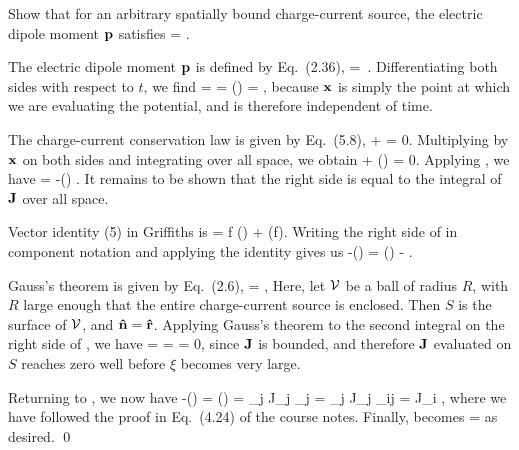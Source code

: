 \begin{statement}{}
	Show that for an arbitrary spatially bound charge-current source, the electric dipole moment $\vb{p}$ satisfies
	\beq
		 = \int \vJ \dcx.
	\eeq
\end{statement}

\begin{solution}
	The electric dipole moment $\vb{p}$ is defined by Eq.~(2.36),
	\beqn \label{dipole}
		\vp = \int \vx \,\rhox \dcx.
	\eeqn
	Differentiating both sides with respect to $t$, we find
	\beqn \label{pder}
		 =  \int \vx \rho \dcx = \int {} (\vx \rho) \dcx
		= \int \vx {} \dcx,
	\eeqn
	because $\vb{x}$ is simply the point at which we are evaluating the potential, and is therefore independent of time.
	
	The charge-current conservation law is given by Eq.~(5.8),
	\beqn \label{continuity}
		 + \div{\vJ} = 0.
	\eeqn
	Multiplying by $\vb{x}$ on both sides and integrating over all space, we obtain
	\beq
		\int \vx {} \dcx + \int \vx (\div{\vJ}) \dcx = 0.
	\eeq
	Applying , we have
	\beqn \label{thing1}
		 = -\int \vx (\div{\vJ}) \dcx.
	\eeqn
	It remains to be shown that the right side is equal to the integral of $\vb{J}$ over all space.
	
	Vector identity (5) in Griffiths is
	\beq
		 = f (\div{\vaa}) + \vaa \vdot (\grad f).
	\eeq
	Writing the right side of  in component notation and applying the identity gives us
	\beqn \label{thing2}
		-\int \xi (\div{\vJ}) \dcx = \int \vJ \vdot (\grad \xi) \dcx - \int \div{(\xi \vJ)} \dcx.
	\eeqn
	
	Gauss's theorem is given by Eq.~(2.6),
	\beq
		\intcV \div{\vv} \dcx = \intS \vv \vdot \nh \dS,
	\eeq
	Here, let $\mathcal{V}$ be a ball of radius $R$, with $R$ large enough that the entire charge-current source is enclosed.  Then $S$ is the surface of $\mathcal{V}$, and $\vb{\hat{n}} = \vb{\hat{r}}$.  Applying Gauss's theorem to the second integral on the right side of , we have
	\beq
		\int \div{(\xi \vJ)} \dcx = \limRi \intcV \div{(\xi \vJ)} \dcx
		= \limRi \intS \xi \vJ \vdot \rh \dS
		= 0,
	\eeq
	since $\vb{J}$ is bounded, and therefore $\vb{J}$ evaluated on $S$ reaches zero well before $\xi$ becomes very large.
	
	Returning to , we now have
	\beq
		-\int \xi (\div{\vJ}) \dcx = \int \vJ \vdot (\grad \xi) \dcx
		= \sum_j \int J_j \partial_j \xi \dcx
		= \sum_j \int J_j \del_{ij} \dcx
		= \int J_i \dcx,
	\eeq
	where we have followed the proof in Eq.~(4.24) of the course notes.  Finally,  becomes
	\beq
		 = \int \vJ \dcx
	\eeq
	as desired. \qed
\end{solution}